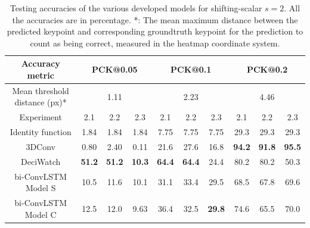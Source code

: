\documentclass[./main.tex]{subfiles}
\begin{document}
\begin{table}[htbp]
    \begin{tabular}{c||ccc|ccc|ccc}
        \hline
        Accuracy metric & \multicolumn{3}{c}{PCK@0.05} & \multicolumn{3}{c}{PCK@0.1} & \multicolumn{3}{c}{PCK@0.2} \\
        \hline
        Mean threshold distance (px)* & \multicolumn{3}{c}{1.11} & \multicolumn{3}{c}{2.23} & \multicolumn{3}{c}{4.46} \\
        \hline
        Experiment & 2.1 & 2.2 & 2.3 & 2.1 & 2.2 & 2.3 & 2.1 & 2.2 & 2.3 \\
        \hline
        \hline
        Identity function & 1.84 & 1.84 & 1.84 & 7.75 & 7.75 & 7.75 & 29.3 & 29.3 & 29.3 \\
        3DConv & 0.80 & 2.40 & 0.11 & 21.6 & 27.6 & 16.8 & \textbf{94.2} & \textbf{91.8} & \textbf{95.5} \\
        DeciWatch & \textbf{51.2} & \textbf{51.2} & \textbf{10.3} & \textbf{64.4} & \textbf{64.4} & 24.4 & 80.2 & 80.2 & 50.3 \\
        bi-ConvLSTM Model S & 10.5 & 11.6 & 10.1 & 31.1 & 33.4 & 29.5 & 68.5 & 67.8 & 69.6 \\
        bi-ConvLSTM Model C & 12.5 & 12.0 & 9.63 & 36.4 & 32.5 & \textbf{29.8} & 74.6 & 65.5 & 70.0 \\
        \hline
    \end{tabular}
    \caption{Testing accuracies of the various developed models for shifting-scalar $s = 2$. All the accuracies are in percentage. *: The mean maximum distance between the predicted keypoint and corresponding groundtruth keypoint for the prediction to count as being correct, measured in the heatmap coordinate system.}
    \label{tab:pretrain_test_accs_2}
\end{table}
\end{document}
